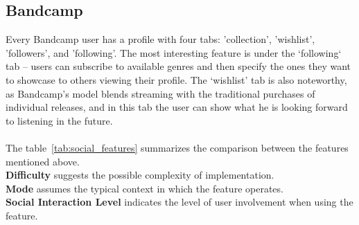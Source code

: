 \subsection{Bandcamp}
Every Bandcamp user has a profile with four tabs: 'collection', 'wishlist', 'followers', and 'following'.
The most interesting feature is under the `following` tab -- users can subscribe to available genres and then
specify the ones they want to showcase to others viewing their profile.
The ‘wishlist’ tab is also noteworthy,
as Bandcamp’s model blends streaming with the traditional purchases of individual releases, and
in this tab the user can show what he is looking forward to listening in the future.
\\\\
The table~\ref{tab:social_features} summarizes the comparison between the features mentioned above.\\
\textbf{Difficulty} suggests the possible complexity of implementation.\\
\textbf{Mode} assumes the typical context in which the feature operates.\\
\textbf{Social Interaction Level} indicates the level of user involvement when using the feature.\\

